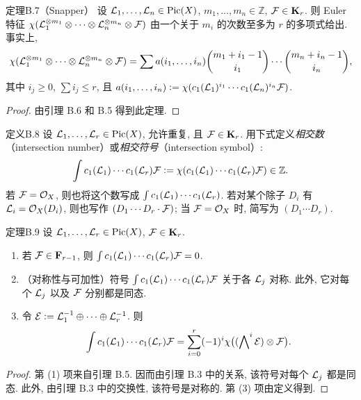 \begin{origstatement}{定理}{B.7（Snapper）}\label{appB:7}
设 $\mathcal L_1,\ldots,\mathcal L_n\in\operatorname{Pic}(X)$, $m_1,\ldots,m_n\in\mathbb Z$, $\mathcal F\in\mathbf K_r$. 则 Euler 特征 $\chi(\mathcal L_1^{\otimes m_1}\otimes\cdots\otimes\mathcal L_n^{\otimes m_n}\otimes\mathcal F)$ 由一个关于 $m_i$ 的次数至多为 $r$ 的多项式给出. 事实上,
\[\chi(\mathcal L_1^{\otimes m_1}\otimes\cdots\otimes\mathcal L_n^{\otimes m_n}\otimes\mathcal F)
=\sum a(i_1,\ldots,i_n)\binom{m_1+i_1-1}{i_1}\cdots\binom{m_n+i_n-1}{i_n},\]
其中 $i_j\ge0$, $\sum i_j\le r$, 且 $a(i_1,\ldots,i_n)\mathrel{\mathop:}=\chi(c_1(\mathcal L_1)^{i_1}\cdots c_1(\mathcal L_n)^{i_n}\mathcal F)$.
\end{origstatement}
\begin{proof}
由引理 B.6 和 B.5 得到此定理.
\end{proof}

\begin{origstatement}{定义}{B.8}\label{appB:8}
设 $\mathcal L_1,\ldots,\mathcal L_r\in\operatorname{Pic}(X)$, 允许重复, 且 $\mathcal F\in\mathbf K_r$. 用下式定义\emph{相交数}（intersection number）或\emph{相交符号}（intersection symbol）:
\[\int c_1(\mathcal L_1)\cdots c_1(\mathcal L_r)\mathcal F\mathrel{\mathop:}=\chi(c_1(\mathcal L_1)\cdots c_1(\mathcal L_r)\mathcal F)\in\mathbb Z.\]
若 $\mathcal F=\mathcal O_X$, 则也将这个数写成 $\int c_1(\mathcal L_1)\cdots c_1(\mathcal L_r)$. 若对某个除子 $D_i$ 有 $\mathcal L_i=\mathcal O_X(D_i)$, 则也写作 $(D_1\cdots D_r\cdot\mathcal F)$; 当 $\mathcal F=\mathcal O_X$ 时, 简写为 $(D_1\cdots D_r)$.
\end{origstatement}

\begin{origstatement}{定理}{B.9}\label{appB:9}
设 $\mathcal L_1,\ldots,\mathcal L_r\in\operatorname{Pic}(X)$, $\mathcal F\in\mathbf K_r$.
\begin{enumerate}[label=(\arabic*)]
\item 若 $\mathcal F\in\mathbf F_{r-1}$, 则 $\int c_1(\mathcal L_1)\cdots c_1(\mathcal L_r)\mathcal F=0$.
\item （对称性与可加性）符号 $\int c_1(\mathcal L_1)\cdots c_1(\mathcal L_r)\mathcal F$ 关于各 $\mathcal L_j$ 对称. 此外, 它对每个 $\mathcal L_j$ 以及 $\mathcal F$ 分别都是同态.
\item 令 $\mathcal E\mathrel{\mathop:}=\mathcal L_1^{-1}\oplus\cdots\oplus\mathcal L_r^{-1}$. 则
\[\int c_1(\mathcal L_1)\cdots c_1(\mathcal L_r)\mathcal F=\sum_{i=0}^r(-1)^i\chi\bigl((\mathop{\bigwedge}\nolimits^i\mathcal E)\otimes\mathcal F\bigr).\]
\end{enumerate}
\end{origstatement}
\begin{proof}
第 (1) 项来自引理 B.5. 因而由引理 B.3 中的关系, 该符号对每个 $\mathcal L_j$ 都是同态. 此外, 由引理 B.3 中的交换性, 该符号是对称的. 第 (3) 项由定义得到.
\end{proof}

